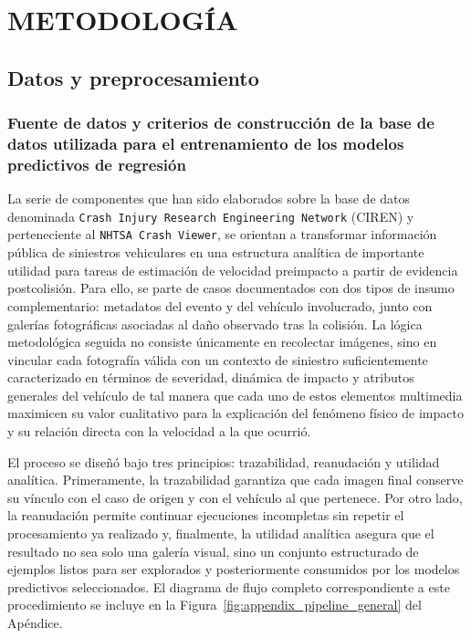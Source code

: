 \documentclass[esp]{SpeedEstimationAI_paper}
\begin{document}
\section{METODOLOGÍA}

\subsection{Datos y preprocesamiento}
\subsubsection{Fuente de datos y criterios de construcción de la base de datos utilizada para el entrenamiento de los modelos predictivos de regresión}

La serie de componentes que han sido elaborados sobre la base de datos denominada \texttt{Crash Injury Research Engineering Network} (CIREN) y perteneciente al \texttt{NHTSA Crash Viewer}, se orientan a transformar información pública de siniestros vehiculares en una estructura analítica de importante utilidad para tareas de estimación de velocidad preimpacto a partir de evidencia postcolisión. Para ello, se parte de casos documentados con dos tipos de insumo complementario: metadatos del evento y del vehículo involucrado, junto con galerías fotográficas asociadas al daño observado tras la colisión. La lógica metodológica seguida no consiste únicamente en recolectar imágenes, sino en vincular cada fotografía válida con un contexto de siniestro suficientemente caracterizado en términos de severidad, dinámica de impacto y atributos generales del vehículo de tal manera que cada uno de estos elementos multimedia maximicen su valor cualitativo para la explicación del fenómeno físico de impacto y su relación directa con la velocidad a la que ocurrió.

El proceso se diseñó bajo tres principios: trazabilidad, reanudación y utilidad analítica. Primeramente, la trazabilidad garantiza que cada imagen final conserve su vínculo con el caso de origen y con el vehículo al que pertenece. Por otro lado, la reanudación permite continuar ejecuciones incompletas sin repetir el procesamiento ya realizado y, finalmente, la utilidad analítica asegura que el resultado no sea solo una galería visual, sino un conjunto estructurado de ejemplos listos para ser explorados y posteriormente consumidos por los modelos predictivos seleccionados. El diagrama de flujo completo correspondiente a este procedimiento se incluye en la Figura~\ref{fig:appendix_pipeline_general} del Apéndice.
\end{document}
